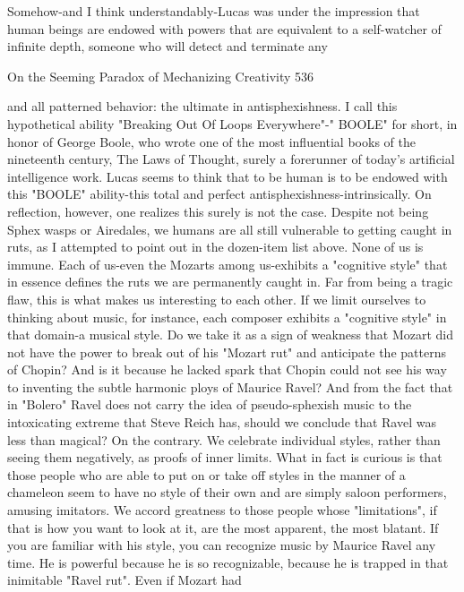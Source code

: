         Somehow-and I think understandably-Lucas was under the impression that
human beings are endowed with powers that are equivalent to a self-watcher of
infinite depth, someone who will detect and terminate any




On the Seeming Paradox of Mechanizing Creativity                                    536

and all patterned behavior: the ultimate in antisphexishness. I call this hypothetical
ability "Breaking Out Of Loops Everywhere"-" BOOLE" for short, in honor of
George Boole, who wrote one of the most influential books of the nineteenth century,
The Laws of Thought, surely a forerunner of today's artificial intelligence work.
        Lucas seems to think that to be human is to be endowed with this "BOOLE"
ability-this total and perfect antisphexishness-intrinsically. On reflection, however,
one realizes this surely is not the case. Despite not being Sphex wasps or Airedales,
we humans are all still vulnerable to getting caught in ruts, as I attempted to point out
in the dozen-item list above. None of us is immune. Each of us-even the Mozarts
among us-exhibits a "cognitive style" that in essence defines the ruts we are
permanently caught in.
        Far from being a tragic flaw, this is what makes us interesting to each other. If
we limit ourselves to thinking about music, for instance, each composer exhibits a
"cognitive style" in that domain-a musical style. Do we take it as a sign of weakness
that Mozart did not have the power to break out of his "Mozart rut" and anticipate the
patterns of Chopin? And is it because he lacked spark that Chopin could not see his
way to inventing the subtle harmonic ploys of Maurice Ravel? And from the fact that
in "Bolero" Ravel does not carry the idea of pseudo-sphexish music to the
intoxicating extreme that Steve Reich has, should we conclude that Ravel was less
than magical?
        On the contrary. We celebrate individual styles, rather than seeing them
negatively, as proofs of inner limits. What in fact is curious is that those people who
are able to put on or take off styles in the manner of a chameleon seem to have no
style of their own and are simply saloon performers, amusing imitators. We accord
greatness to those people whose "limitations", if that is how you want to look at it, are
the most apparent, the most blatant. If you are familiar with his style, you can
recognize music by Maurice Ravel any time. He is powerful because he is so
recognizable, because he is trapped in that inimitable "Ravel rut". Even if Mozart had
